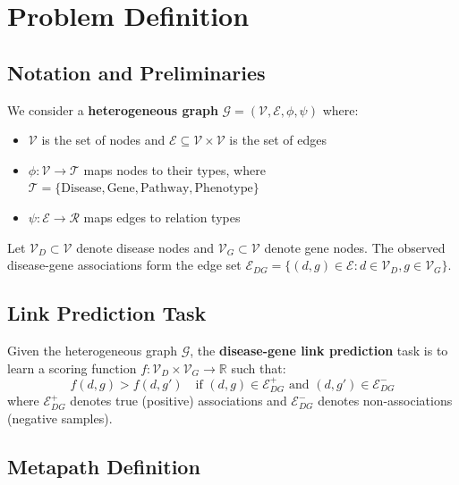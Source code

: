 \documentclass[11pt]{article}
\newcommand{\set}[1]{\mathcal{#1}}
\newcommand{\real}{\mathbb{R}}
\begin{document}
\section{Problem Definition}
\label{sec:problem}

\subsection{Notation and Preliminaries}

We consider a \textbf{heterogeneous graph} $\set{G} = (\set{V}, \set{E}, \phi, \psi)$ where:
\begin{itemize}
    \item $\set{V}$ is the set of nodes and $\set{E} \subseteq \set{V} \times \set{V}$ is the set of edges
    \item $\phi: \set{V} \rightarrow \set{T}$ maps nodes to their types, where $\set{T} = \{\text{Disease}, \text{Gene}, \text{Pathway}, \text{Phenotype}\}$
    \item $\psi: \set{E} \rightarrow \set{R}$ maps edges to relation types
\end{itemize}

Let $\set{V}_D \subset \set{V}$ denote disease nodes and $\set{V}_G \subset \set{V}$ denote gene nodes. The observed disease-gene associations form the edge set $\set{E}_{DG} = \{(d, g) \in \set{E} : d \in \set{V}_D, g \in \set{V}_G\}$.

\subsection{Link Prediction Task}

Given the heterogeneous graph $\set{G}$, the \textbf{disease-gene link prediction} task is to learn a scoring function $f: \set{V}_D \times \set{V}_G \rightarrow \real$ such that:
\begin{equation}
    f(d, g) > f(d, g') \quad \text{if } (d,g) \in \set{E}_{DG}^+ \text{ and } (d,g') \in \set{E}_{DG}^-
\end{equation}
where $\set{E}_{DG}^+$ denotes true (positive) associations and $\set{E}_{DG}^-$ denotes non-associations (negative samples).

\subsection{Metapath Definition}
\end{document}
